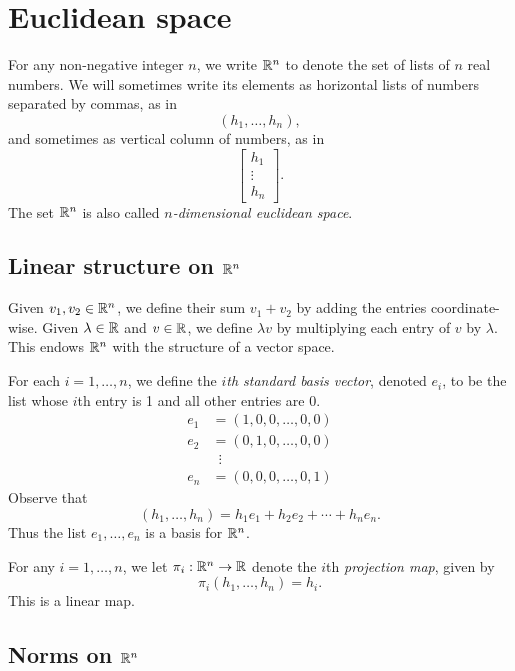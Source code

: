 \section{Euclidean space} \label{euclidean}

For any non-negative integer $n$, we write $\mathbb{R}^n$ to denote the set of lists of $n$ real numbers. We will sometimes write its elements as horizontal lists of numbers separated by commas, as in \[ (h_1, \dotsc, h_n), \] and sometimes as vertical column of numbers, as in \[ \begin{bmatrix} h_1 \\ \vdots \\ h_n \end{bmatrix}.  \]
The set $\mathbb{R}^n$ is also called \emph{$n$-dimensional euclidean space}.

\subsection{Linear structure on \texorpdfstring{$\mathbb{R}^n$}{Rn}}

Given $v_1, v_2 \in \mathbb{R}^n$, we define their sum $v_1 + v_2$ by adding the entries coordinate-wise. Given $\lambda \in \mathbb{R}$ and $v \in \mathbb{R}$, we define $\lambda v$ by multiplying each entry of $v$ by $\lambda$. This endows $\mathbb{R}^n$ with the structure of a vector space. 

For each $i = 1,  \dotsc, n$, we define the \emph{$i$th standard basis vector}, denoted $e_i$, to be the list whose $i$th entry is 1 and all other entries are 0. 
\[ \begin{aligned} e_1 &= (1, 0, 0, \dotsc, 0, 0) \\
e_2 &= (0, 1, 0, \dotsc, 0, 0) \\
&\enspace \vdots \\
e_n &= (0, 0, 0, \dotsc, 0, 1) \end{aligned} \]
Observe that
\[ (h_1, \dotsc, h_n) = h_1 e_1 + h_2 e_2 + \dotsb + h_n e_n.  \]
Thus the list $e_1, \dotsc, e_n$ is a basis for $\mathbb{R}^n$. 

For any $i = 1, \dotsc, n$, we let $\pi_i : \mathbb{R}^n \to \mathbb{R}$ denote the $i$th \emph{projection map}, given by 
\[ \pi_i(h_1, \dotsc, h_n) = h_i. \]
This is a linear map. 

\subsection{Norms on \texorpdfstring{$\mathbb{R}^n$}{Rn}}

